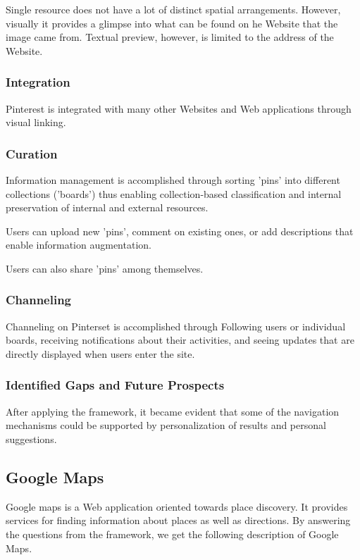 {{{Single resource does not have a lot of distinct spatial arrangements. However, visually it provides a glimpse into what can be found on he Website that the image came from. Textual preview, however, is limited to the address of the Website.
}%


{\subsubsection{Integration}
Pinterest is integrated with many other Websites and Web applications through visual linking.

}%


{\subsubsection{Curation}

Information management is accomplished through sorting 'pins' into different collections ('boards') thus enabling collection-based classification and internal preservation of internal and external resources. 
}%


Users can upload new 'pins', comment on existing ones, or add descriptions that enable information augmentation. 

Users can also share 'pins' among themselves. 
{\subsubsection{Channeling}
Channeling on Pinterset is accomplished through Following users or individual boards, receiving notifications about their activities, and seeing updates that are directly displayed when users enter the site. 
}%

{\subsubsection{Identified Gaps and Future Prospects}
After applying the framework, it became evident that some of the navigation mechanisms could be supported by personalization of results and personal suggestions.
}%
} %


{\subsection{Google Maps}
Google maps is a Web application oriented towards place discovery. It provides services for finding information about places as well as directions.  By answering the questions from the framework, we get the following description of Google Maps.

}}
